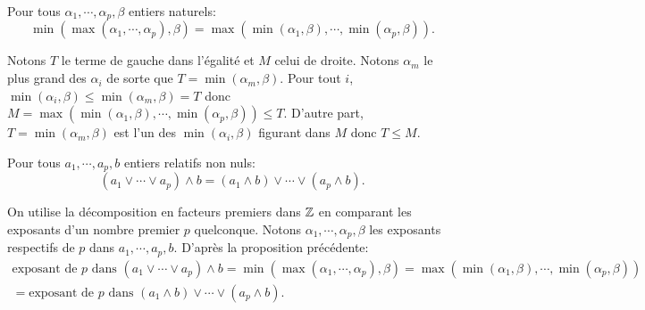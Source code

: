 \begin{lem}
  Pour tous $\alpha_1, \cdots, \alpha_p, \beta$ entiers naturels:
  \begin{displaymath}
    \min \left( \max(\alpha_1, \cdots, \alpha_p) , \beta \right) = \max\left( \min(\alpha_1, \beta), \cdots , \min(\alpha_p,\beta)\right).
  \end{displaymath}
\end{lem}
\begin{demo}
  Notons $T$ le terme de gauche dans l'égalité et $M$ celui de droite. Notons $\alpha_m$ le plus grand des $\alpha_i$ de sorte que $T = \min(\alpha_m, \beta)$.\newline
  Pour tout $i$, $\min(\alpha_i, \beta) \leq \min (\alpha_m, \beta) = T$ donc $M = \max\left( \min(\alpha_1, \beta), \cdots , \min(\alpha_p,\beta)\right) \leq T$.\newline
  D'autre part, $T=\min (\alpha_m, \beta)$ est l'un des $\min(\alpha_i, \beta)$ figurant dans $M$ donc $T \leq M$.
\end{demo}

\begin{propn}
  Pour tous $a_1, \cdots ,a_p, b$ entiers relatifs non nuls:
  \begin{displaymath}
    \left(a_1 \vee \cdots \vee a_p\right)\wedge b = (a_1 \wedge b) \vee \cdots \vee (a_p \wedge b).
  \end{displaymath}
\end{propn}
\begin{demo}
  On utilise la décomposition en facteurs premiers dans $\mathbb{Z}$ en comparant les exposants d'un nombre premier $p$ quelconque. Notons $\alpha_1, \cdots, \alpha_p, \beta$ les exposants respectifs de $p$ dans $a_1, \cdots, a_p, b$. D'après la proposition précédente:
  \begin{align*}
    \text{exposant de $p$ dans } \left(a_1 \vee \cdots \vee a_p\right)\wedge b
    = \min \left( \max(\alpha_1, \cdots, \alpha_p) , \beta \right)
    = \max\left( \min(\alpha_1, \beta), \cdots , \min(\alpha_p,\beta)\right) \\
    = \text{exposant de $p$ dans } (a_1 \wedge b) \vee \cdots \vee (a_p \wedge b).
  \end{align*}
\end{demo}

